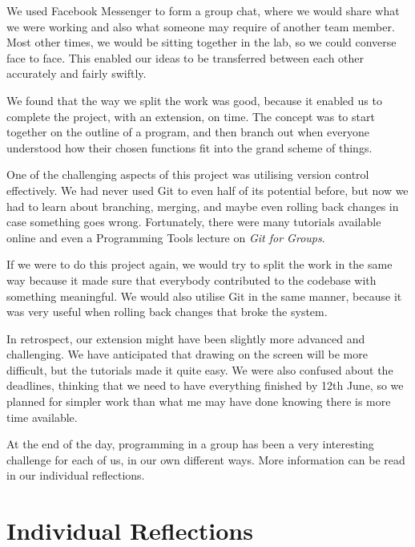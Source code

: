 \documentclass[9pt]{article}
\begin{document}
We used Facebook Messenger to form a group chat, where we would share what we were working and also what someone may require of another team member. Most other times, we would be sitting together in the lab, so we could converse face to face. This enabled our ideas to be transferred between each other accurately and fairly swiftly.

We found that the way we split the work was good, because it enabled us to complete the project, with an extension, on time. The concept was to start together on the outline of a program, and then branch out when everyone understood how their chosen functions fit into the grand scheme of things.

One of the challenging aspects of this project was utilising version control effectively. We had never used Git to even half of its potential before, but now we had to learn about branching, merging, and maybe even rolling back changes in case something goes wrong. Fortunately, there were many tutorials available online and even a Programming Tools lecture on \textit{Git for Groups}.

If we were to do this project again, we would try to split the work in the same way because it made sure that everybody contributed to the codebase with something meaningful. We would also utilise Git in the same manner, because it was very useful when rolling back changes that broke the system.

In retrospect, our extension might have been slightly more advanced and challenging. We have anticipated that drawing on the screen will be more difficult, but the tutorials made it quite easy. We were also confused about the deadlines, thinking that we need to have everything finished by 12th June, so we planned for simpler work than what me may have done knowing there is more time available.

At the end of the day, programming in a group has been a very interesting challenge for each of us, in our own different ways. More information can be read in our individual reflections.

\section*{Individual Reflections}
\end{document}
